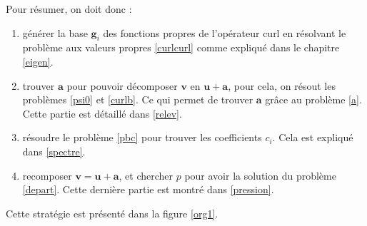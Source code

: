 Pour résumer, on doit donc :
\begin{enumerate}
\item générer la base $\mathbf{g}_i$ des fonctions propres de l'opérateur curl en résolvant le problème aux valeurs propres \ref{curlcurl} comme expliqué dans le chapitre \ref{eigen}.
\item trouver $\mathbf{a}$ pour pouvoir décomposer $\mathbf{v}$ en $\mathbf{u}+\mathbf{a}$, pour cela, on résout les problèmes \ref{psi0} et \ref{curlb}. Ce qui permet de trouver $\mathbf{a}$ grâce au problème \ref{a}. Cette partie est détaillé dans \ref{relev}.
\item résoudre le problème \ref{pbc} pour trouver les coefficients $c_i$. Cela est expliqué dans \ref{spectre}.
\item recomposer $\mathbf{v}=\mathbf{u}+\mathbf{a}$, et chercher $p$ pour avoir la solution du problème \ref{depart}. Cette dernière partie est montré dans \ref{pression}.
\end{enumerate}
Cette stratégie est présenté dans la figure \ref{org1}.
